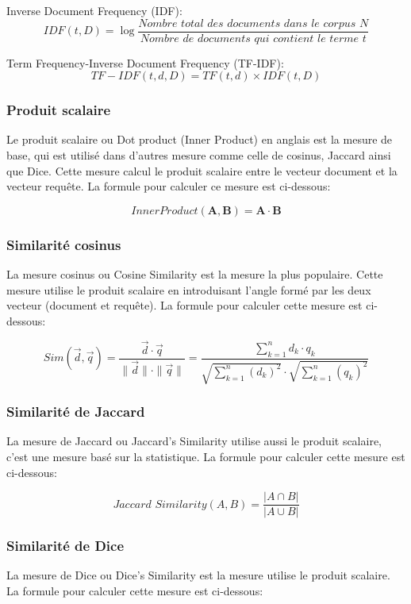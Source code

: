 Inverse Document Frequency (IDF):
\[
    IDF(t, D) = \log\frac{\textit{Nombre total des documents dans le corpus } N}{\textit{Nombre de documents qui contient le terme } t}
\]

Term Frequency-Inverse Document Frequency (TF-IDF):
\[
    TF-IDF(t, d, D) = \textit{TF}(t, d) \times \textit{IDF}(t, D)
\]

\subsubsection{Produit scalaire}
Le produit scalaire ou Dot product (Inner Product) en anglais est la mesure de base, qui est utilisé dans d'autres mesure comme celle de cosinus, Jaccard ainsi que Dice. Cette mesure calcul le produit scalaire entre le vecteur document et la vecteur requête. La formule pour calculer ce mesure est ci-dessous:

\[
    Inner Product(\mathbf{A}, \mathbf{B}) = \mathbf{A} \cdot \mathbf{B}
\]

\subsubsection{Similarité cosinus}
La mesure cosinus ou Cosine Similarity est la mesure la plus populaire. Cette mesure utilise le produit scalaire en introduisant l'angle formé par les deux vecteur (document et requête). La formule pour calculer cette mesure est ci-dessous:

\[
    Sim(\vec{d}, \vec{q}) = \frac{\vec{d} \cdot \vec{q}}{\|\vec{d}\| \cdot \|\vec{q}\|} = \frac{\sum_{k=1}^{n} d_{k} \cdot q_{k}}{\sqrt{\sum_{k=1}^{n} (d_{k})^2} \cdot \sqrt{\sum_{k=1}^{n} (q_{k})^2}}
\]

\subsubsection{Similarité de Jaccard}
La mesure de Jaccard ou Jaccard's Similarity utilise aussi le produit scalaire, c'est une mesure basé sur la statistique. La formule pour calculer cette mesure est ci-dessous:

\[
    \textit{Jaccard Similarity}(A, B) = \frac{|A \cap B|}{|A \cup B|}
\]

\subsubsection{Similarité de Dice}
La mesure de Dice ou Dice's Similarity est la mesure utilise le produit scalaire. La formule pour calculer cette mesure est ci-dessous:

